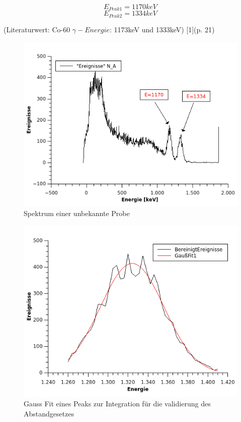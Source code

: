 \documentclass[12pt,a4paper]{article}
\begin{document}
\begin{multicols}{2}
$$E_{Peak1} = 1170keV$$
$$E_{Peak2} = 1334keV$$

\noindent
(Literaturwert: Co-60 $\gamma-Energie$: 1173keV und 1333keV) [1](p. 21)\\

\begin{figure}[H]
	\centering
	\includegraphics[scale=1.2]{./figures/UnbekannteProbeSpektrum.png}
	\caption{Spektrum einer unbekannte Probe}
	\label{fig:ausw_gammabetta_unbekannt}
\end{figure}

\begin{figure}[H]
	\centering
	\includegraphics[scale=1.2]{./figures/GammaBetaExample_Gauss.png}
	\caption{Gauss Fit eines Peaks zur Integration für die validierung des Abstandgesetzes}
	\label{fig:ausw_gammabetta_abstand}
\end{figure}




\end{multicols}
\end{document}
